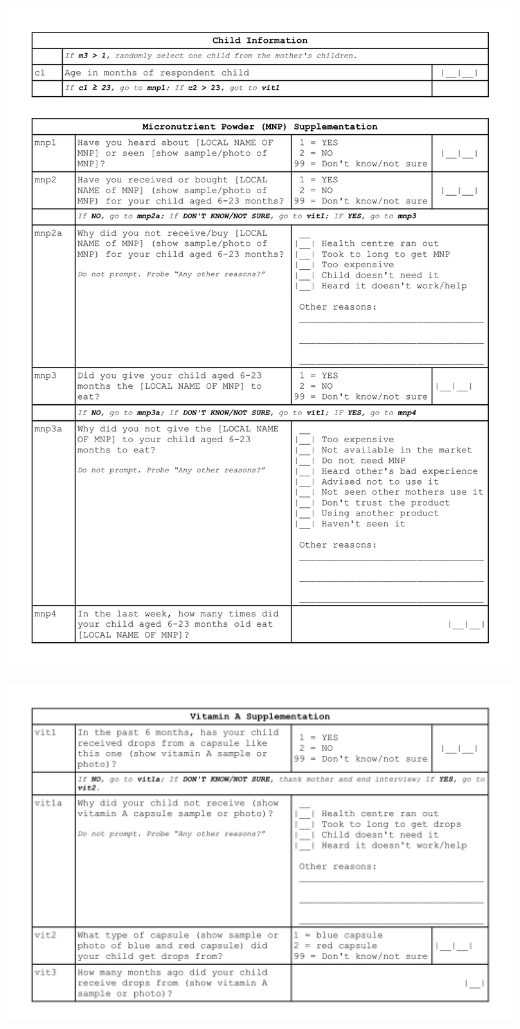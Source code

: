 \documentclass[12pt,a4paper]{article}
\begin{document}
\begin{center}\includegraphics[width=0.9\linewidth]{forms/childForm3} \end{center}

\begin{center}\includegraphics[width=0.9\linewidth]{forms/childForm4} \end{center}

\newpage

\renewcommand\refname{References}

\end{document}
